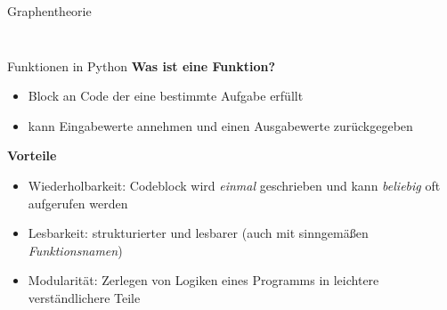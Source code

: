 \documentclass[aspectratio=169]{beamer}
\begin{document}
\begin{frame}{Graphentheorie}
\begin{columns}
\begin{column}{0.5\textwidth}
\begin{figure}[h]
{
            }
        \end{figure}
        \end{column}
    \end{columns}
\end{frame}

\begin{frame}{Funktionen in Python}
    \pause
    \textbf{Was ist eine Funktion?}
    \pause
    \begin{itemize}
        \item Block an Code der eine bestimmte Aufgabe erfüllt
        \pause
        \item kann Eingabewerte annehmen und einen Ausgabewerte zurückgegeben
    \end{itemize}
    \pause
    \textbf{Vorteile}
    \begin{itemize}
    \pause
        \item Wiederholbarkeit: Codeblock wird \textit{einmal} geschrieben und kann \textit{beliebig} oft aufgerufen werden
        \pause
        \item Lesbarkeit: strukturierter und lesbarer (auch mit sinngemäßen \textit{Funktionsnamen})
        \pause
        \item Modularität: Zerlegen von Logiken eines Programms in leichtere verständlichere Teile
    \end{itemize}
\end{frame}
\end{document}
